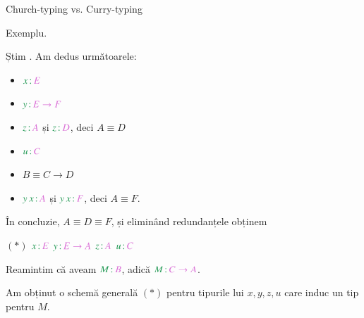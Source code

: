 \documentclass[xcolor=pdftex,romanian,colorlinks]{beamer}
\begin{document}
\begin{frame}{Church-typing vs. Curry-typing}

{\color{True} Exemplu.}

Știm . Am dedus următoarele:
\vspace{-.2cm}
\begin{itemize}
	\item {\color{True}$\type{x}{E}$}
	\item {\color{True}$\type{y}{E \to F}$}
	\item {\color{True}$\type{z}{A}$} și {\color{True}$\type{z}{D}$}, deci $A \equiv D$
	\item {\color{True}$\type{u}{C}$} 
	\item $B \equiv C \to D$ 
	\item {\color{True}$\type{\app{y}{x}}{A}$} și {\color{True}$\type{\app{y}{x}}{F}$}, deci $A \equiv F$.
\end{itemize}
În concluzie, $A \equiv D \equiv F$, și eliminând redundanțele obținem
\vspace{-.2cm}
\begin{center}
$(*)$ \hspace{.3cm}
{\color{True}$\type{x}{E}$} \hspace{.3cm}
{\color{True}$\type{y}{E \to A}$}  \hspace{.3cm}
{\color{True}$\type{z}{A}$}  \hspace{.3cm}
{\color{True}$\type{u}{C}$} 
\end{center}
\vspace{-.2cm}
Reamintim că aveam {\color{True}$\type{M}{B}$}, adică {\color{True}$\type{M}{C \to A}$}.

Am obținut o schemă generală $(*)$ pentru tipurile lui $x,y,z,u$ care induc un tip pentru $M$.
\end{frame}
\end{document}
